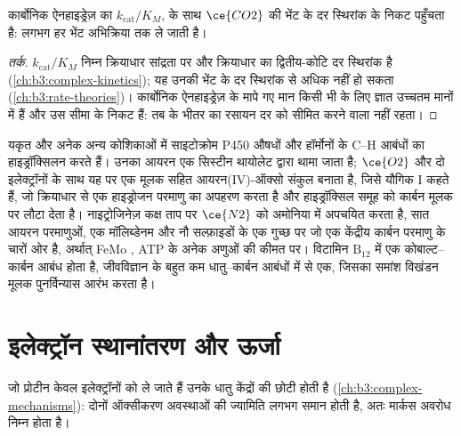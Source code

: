 \begin{proposition}[एक तीव्र एंज़ाइम]\label{prop:b3:bioinorganic:carbonic-anhydrase}
कार्बोनिक ऐनहाइड्रेज़ का  $k_{\mathrm{cat}}/K_M$,  के साथ $\ce{CO2}$ की भेंट के
दर स्थिरांक के निकट पहुँचता है: लगभग हर भेंट
अभिक्रिया तक ले जाती है।
\end{proposition}

\begin{proof}[तर्क]
$k_{\mathrm{cat}}/K_M$ निम्न क्रियाधार सांद्रता पर  और क्रियाधार का द्वितीय-कोटि दर स्थिरांक है
(\cref{ch:b3:complex-kinetics}); यह उनकी भेंट के
 दर स्थिरांक से अधिक नहीं हो सकता
(\cref{ch:b3:rate-theories})। कार्बोनिक ऐनहाइड्रेज़ के मापे गए मान
किसी भी  के लिए ज्ञात उच्चतम मानों में हैं और उस सीमा के निकट हैं: तब  के भीतर का
रसायन दर को सीमित करने वाला नहीं रहता।
\end{proof}

यकृत और अनेक अन्य कोशिकाओं में साइटोक्रोम P450  औषधों और हॉर्मोनों के C--H
आबंधों का हाइड्रॉक्सिलन करते हैं। उनका  आयरन एक सिस्टीन थायोलेट द्वारा थामा जाता है;
$\ce{O2}$ और दो इलेक्ट्रॉनों के साथ यह  पर एक मूलक सहित आयरन(IV)-ऑक्सो संकुल बनाता है,
जिसे यौगिक I कहते हैं, जो क्रियाधार से एक हाइड्रोजन परमाणु का
अपहरण करता है और हाइड्रॉक्सिल समूह को कार्बन मूलक पर लौटा देता है। नाइट्रोजिनेज़
कक्ष ताप पर $\ce{N2}$ को अमोनिया में अपचयित करता है, सात आयरन परमाणुओं, एक मॉलिब्डेनम
और नौ सल्फ़ाइडों के एक गुच्छ पर जो एक केंद्रीय कार्बन परमाणु के चारों ओर है, अर्थात् FeMo
, ATP के अनेक अणुओं की कीमत पर। विटामिन $\mathrm{B_{12}}$ में एक
कोबाल्ट--कार्बन आबंध होता है, जीवविज्ञान के बहुत कम धातु--कार्बन आबंधों में से एक, जिसका
समांश विखंडन मूलक पुनर्विन्यास आरंभ करता है।

\section{इलेक्ट्रॉन स्थानांतरण और ऊर्जा}

जो प्रोटीन केवल इलेक्ट्रॉनों को ले जाते हैं उनके धातु केंद्रों की
 छोटी होती है (\cref{ch:b3:complex-mechanisms}): दोनों ऑक्सीकरण
अवस्थाओं की ज्यामिति लगभग समान होती है, अतः मार्कस अवरोध निम्न होता है।

